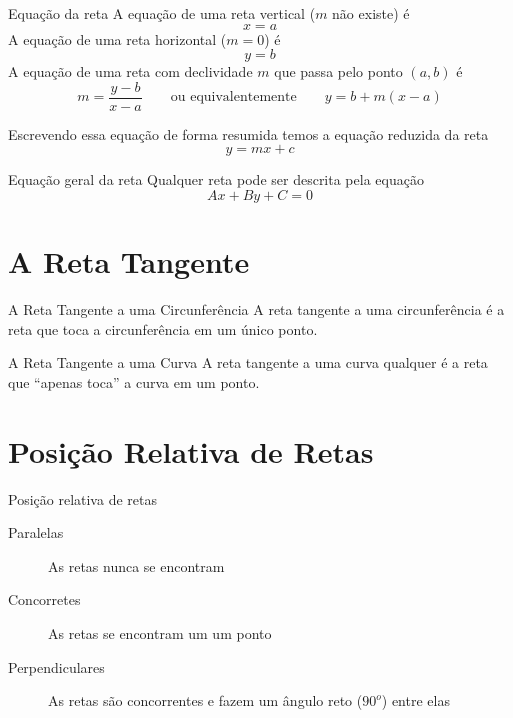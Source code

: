 \begin{teoria}{Equação da reta}
    A equação de uma reta vertical ($m$ não existe) é
    \[ x = a \]
    A equação de uma reta horizontal ($m=0$) é 
    \[ y = b \]
    A equação de uma reta com declividade $m$ que passa pelo ponto $(a,b)$ é
    \[ m = \frac{y-b}{x-a} \qquad \text{ou equivalentemente} \qquad y = b + m(x-a) \]
    
    Escrevendo essa equação de forma resumida temos a equação reduzida da reta
    \[ y = mx + c \]
    
\end{teoria}

\begin{teoria}{Equação geral da reta}
    Qualquer reta pode ser descrita pela equação 
    \[ Ax + By + C = 0 \]
\end{teoria}

\section{A Reta Tangente}

\begin{teoria}{A Reta Tangente a uma Circunferência}
    A reta tangente a uma circunferência é a reta que toca a circunferência em um único ponto.
\end{teoria}

\begin{teoria}{A Reta Tangente a uma Curva}
    A reta tangente a uma curva qualquer é a reta que ``apenas toca'' a curva em um ponto.
\end{teoria}

\section{Posição Relativa de Retas}

\begin{teoria}{Posição relativa de retas}
    \begin{description}
        \item[Paralelas]       As retas nunca se encontram
        \item[Concorretes]     As retas se encontram um um ponto
        \item[Perpendiculares] As retas são concorrentes e fazem um ângulo reto ($90^o$) entre elas
    \end{description}    
\end{teoria}

